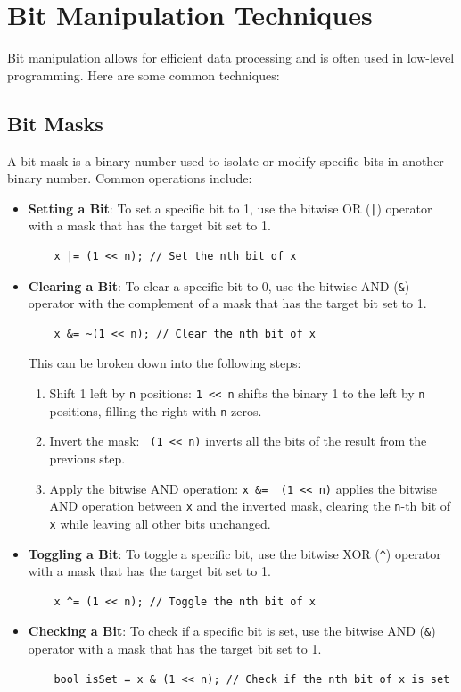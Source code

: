 \documentclass{article}
\begin{document}
\section*{Bit Manipulation Techniques}

Bit manipulation allows for efficient data processing and is often used in low-level programming. Here are some common techniques:

\subsection*{Bit Masks}
A bit mask is a binary number used to isolate or modify specific bits in another binary number. Common operations include:

\begin{itemize}
    \item \textbf{Setting a Bit}: To set a specific bit to 1, use the bitwise OR (\texttt{|}) operator with a mask that has the target bit set to 1.
    \begin{verbatim}
    x |= (1 << n); // Set the nth bit of x
    \end{verbatim}
    
    \item \textbf{Clearing a Bit}: To clear a specific bit to 0, use the bitwise AND (\texttt{\&}) operator with the complement of a mask that has the target bit set to 1.
    \begin{verbatim}
    x &= ~(1 << n); // Clear the nth bit of x
    \end{verbatim}
    This can be broken down into the following steps:
    \begin{enumerate}
        \item Shift 1 left by \texttt{n} positions: \texttt{1 << n} shifts the binary 1 to the left by \texttt{n} positions, filling the right with \texttt{n} zeros.
        \item Invert the mask: \texttt{~(1 << n)} inverts all the bits of the result from the previous step.
        \item Apply the bitwise AND operation: \texttt{x \&= ~(1 << n)} applies the bitwise AND operation between \texttt{x} and the inverted mask, clearing the \texttt{n}-th bit of \texttt{x} while leaving all other bits unchanged.
    \end{enumerate}
    
    \item \textbf{Toggling a Bit}: To toggle a specific bit, use the bitwise XOR (\texttt{\^}) operator with a mask that has the target bit set to 1.
    \begin{verbatim}
    x ^= (1 << n); // Toggle the nth bit of x
    \end{verbatim}
    
    \item \textbf{Checking a Bit}: To check if a specific bit is set, use the bitwise AND (\texttt{\&}) operator with a mask that has the target bit set to 1.
    \begin{verbatim}
    bool isSet = x & (1 << n); // Check if the nth bit of x is set
    \end{verbatim}
\end{itemize}
\end{document}
